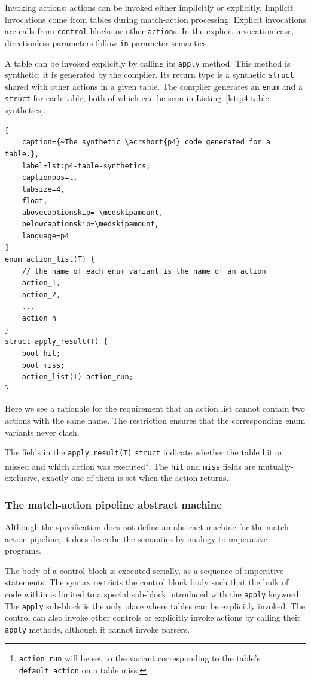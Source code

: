 Invoking actions: actions can be invoked either implicitly or explicitly.
Implicit invocations come from tables during match-action processing. Explicit
invocations are calls from \texttt{control} blocks or other \texttt{action}s. In
the explicit invocation case, directionless parameters follow \texttt{in}
parameter semantics.

A table can be invoked explicitly by calling its \texttt{apply} method. This
method is synthetic; it is generated by the compiler. Its return type is a
synthetic \texttt{struct} shared with other actions in a given table. The
compiler generates an \texttt{enum} and a \texttt{struct} for each table, both
of which can be seen in Listing~\ref{lst:p4-table-synthetics}.

\begin{lstlisting}[
	caption={~The synthetic \acrshort{p4} code generated for a table.},
	label=lst:p4-table-synthetics,
	captionpos=t,
	tabsize=4,
	float,
	abovecaptionskip=-\medskipamount,
	belowcaptionskip=\medskipamount,
	language=p4
]
enum action_list(T) {
	// the name of each enum variant is the name of an action
	action_1,
	action_2,
	...
	action_n
}
struct apply_result(T) {
	bool hit;
	bool miss;
	action_list(T) action_run;
}
\end{lstlisting}

Here we see a rationale for the requirement that an action list cannot contain
two actions with the same name. The restriction ensures that the corresponding
enum variants never clash.

The fields in the \texttt{apply\_result(T)} \texttt{struct} indicate whether the
table hit or missed and which action was executed\footnote{\texttt{action\_run}
will be set to the variant corresponding to the table's \texttt{default\_action}
on a table miss.}. The \texttt{hit} and \texttt{miss} fields are
mutually-exclusive, exactly one of them is set when the action returns.

\subsubsection*{The match-action pipeline abstract machine}

Although the \pfs specification does not define an abstract machine for the
match-action pipeline, it does describe the semantics by analogy to imperative
programs.

The body of a control block is executed serially, as a sequence of imperative
statements. The syntax restricts the control block body such that the bulk of
code within is limited to a special sub-block introduced with the \texttt{apply}
keyword. The \texttt{apply} sub-block is the only place where tables can be
explicitly invoked. The control can also invoke other controls or explicitly
invoke actions by calling their \texttt{apply} methods, although it cannot
invoke parsers.

